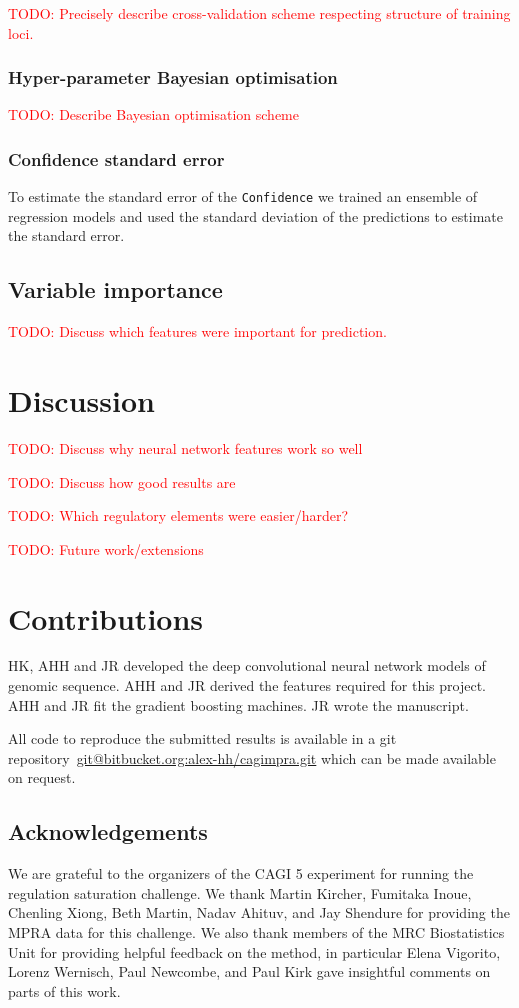 \documentclass{article}
\makeatletter
\newcommand{\todo}[1]{\textcolor{red}{TODO\@: #1}}
\makeatother
\begin{document}
\todo{Precisely describe cross-validation scheme respecting structure of
training loci.}



\subsubsection*{Hyper-parameter Bayesian optimisation}

\todo{Describe Bayesian optimisation scheme}


\subsubsection*{Confidence standard error}

To estimate the standard error of the \texttt{Confidence} we trained an
ensemble of regression models and used the standard deviation of the
predictions to estimate the standard error.


\subsection*{Variable importance}

\todo{Discuss which features were important for prediction.}


\section*{Discussion}

\todo{Discuss why neural network features work so well}

\todo{Discuss how good results are}

\todo{Which regulatory elements were easier/harder?}

\todo{Future work/extensions}


\section*{Contributions}

HK, AHH and JR developed the deep convolutional neural network models of
genomic sequence. AHH and JR derived the features required for this
project. AHH and JR fit the gradient boosting machines. JR wrote the
manuscript.

All code to reproduce the submitted results is available in a git
repository~\url{git@bitbucket.org:alex-hh/cagimpra.git} which can be made
available on request.


\subsection*{Acknowledgements}

We are grateful to the organizers of the CAGI 5 experiment for running the
regulation saturation challenge. We thank Martin Kircher, Fumitaka Inoue,
Chenling Xiong, Beth Martin, Nadav Ahituv, and Jay Shendure for providing the
MPRA data for this challenge. We also thank members of the MRC Biostatistics
Unit for providing helpful feedback on the method, in particular Elena
Vigorito, Lorenz Wernisch, Paul Newcombe, and Paul Kirk gave insightful
comments on parts of this work.


%
%
\printbibliography{}
\end{document}
